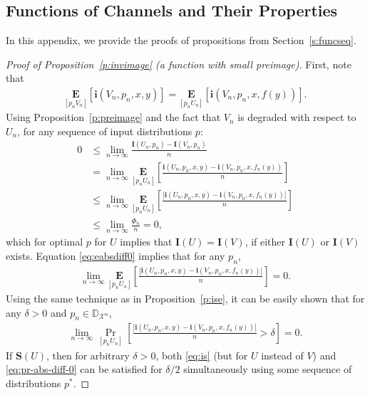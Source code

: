 \documentclass[journal, twocol]{IEEEtran}
\newcommand{\bD}{{\mathbb{D}}}
\newcommand{\bfE}{{\mathbf{E}}}
\newcommand{\bfI}{{\mathbf{I}}}
\newcommand{\bfS}{{\mathbf{S}}}
\newcommand{\mX}{{\mathcal{X}}}
\newcommand{\abs}[1]{\left|{#1}\right|}
\newcommand{\brsq}[1]{{\left[{#1}\right]}}
\newcommand{\bi}{\mathbf{i}}
\newcommand{\pW}[2]{[{#1}{#2}]}
\begin{document}
\begin{appendices}
\section{Functions of Channels and Their Properties}
\label{s:funcapp}

In this appendix, we provide the proofs of propositions from Section~\ref{s:funcseq}.

\begin{proof}[Proof of Proposition~\ref{p:invimage} (a function with small preimage)]
First, note that 
\begin{align}
\underset{\pW{p_n}{V_n}}{\bfE}\brsq{\bi(V_n,p_n,x,y)}=
\underset{\pW{p_n}{U_n}}{\bfE}\brsq{\bi(V_n,p_n,x,f(y))}.    
\end{align}
Using Proposition~\ref{p:preimage} and the fact that $V_n$ is degraded with respect to $U_n$, for any sequence of input distributions $p$:
{\allowdisplaybreaks
\begin{align}
0&
\leq\lim_{n\to\infty}\frac{\bfI(U_n,p_n)-\bfI(V_n,p_n)}{n}
\nonumber\\&
=\lim_{n\to\infty}\underset{\pW{p_n}{U_n}}{\bfE}\brsq{\frac{\bi(U_n,p_n,x,y)-\bi(V_n,p_n,x,f_n(y))}{n}}
\nonumber\\&
\leq \lim_{n\to\infty}\underset{\pW{p_n}{U_n}}{\bfE}\brsq{\frac{\abs{\bi(U_n,p_n,x,y)-\bi(V_n,p_n,x,f_n(y))}}{n}} 
\nonumber\\&
\leq \lim_{n\to\infty}\frac{\Phi_n}{n}=0,
\label{eq:eabsdiff0}
\end{align}
}
which for optimal $p$ for $U$ implies that $\bfI(U)=\bfI(V)$, if either $\bfI(U)$ or $\bfI(V)$ exists.
Equation \eqref{eq:eabsdiff0} implies that for any $p_n$,
\begin{align}
\lim_{n\to\infty}\underset{\pW{p_n}{U_n}}{\bfE}\brsq{\frac{\abs{\bi(U_n,p_n,x,y)\!-\!\bi(V_n,p_n,x,f_n(y))}}{n}}\!=\!0.
\end{align}
Using the same technique as in Proposition~\ref{p:ise}, it can be easily shown that for any $\delta>0$ and $p_n\in\bD_{\mX^n}$,
\begin{align}
\lim_{n\to\infty}\Pr_{\pW{p_n}{U_n}}\brsq{\frac{\abs{\bi(U_n,p_n,x,y)-\bi(V_n,p_n,x,f_n(y))}}{n}\!>\!\delta}=0.
\label{eq:pr-abs-diff-0}
\end{align}
If $\bfS(U)$, then for arbitrary $\delta>0$, both \eqref{eq:is} (but for $U$ instead of $V$) and \eqref{eq:pr-abs-diff-0} can be satisfied for $\delta/2$ simultaneously using some sequence of distributions $p^*$.

\end{proof}
\end{appendices}
\end{document}

